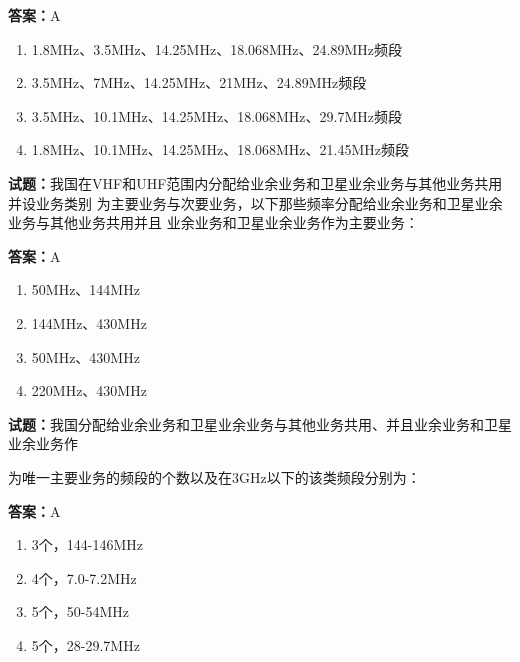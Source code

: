 \documentclass{ctexbook}
\begin{document}
\textbf{答案：}A 

\begin{enumerate}[leftmargin=3em]
  \item 1.8MHz、3.5MHz、14.25MHz、18.068MHz、24.89MHz频段 

  \item 3.5MHz、7MHz、14.25MHz、21MHz、24.89MHz频段 

  \item 3.5MHz、10.1MHz、14.25MHz、18.068MHz、29.7MHz频段 

  \item 1.8MHz、10.1MHz、14.25MHz、18.068MHz、21.45MHz频段 

\end{enumerate}





\vspace{1em}

\textbf{试题：}我国在VHF和UHF范围内分配给业余业务和卫星业余业务与其他业务共用并设业务类别
为主要业务与次要业务，以下那些频率分配给业余业务和卫星业余业务与其他业务共用并且
业余业务和卫星业余业务作为主要业务： 

\textbf{答案：}A 

\begin{enumerate}[leftmargin=3em]
  \item 50MHz、144MHz 

  \item 144MHz、430MHz 

  \item 50MHz、430MHz 

  \item 220MHz、430MHz 

\end{enumerate}





\vspace{1em}

\textbf{试题：}我国分配给业余业务和卫星业余业务与其他业务共用、并且业余业务和卫星业余业务作


为唯一主要业务的频段的个数以及在3GHz以下的该类频段分别为： 

\textbf{答案：}A 

\begin{enumerate}[leftmargin=3em]
  \item 3个，144-146MHz 

  \item 4个，7.0-7.2MHz 

  \item 5个，50-54MHz 

  \item 5个，28-29.7MHz 

\end{enumerate}
\end{document}
